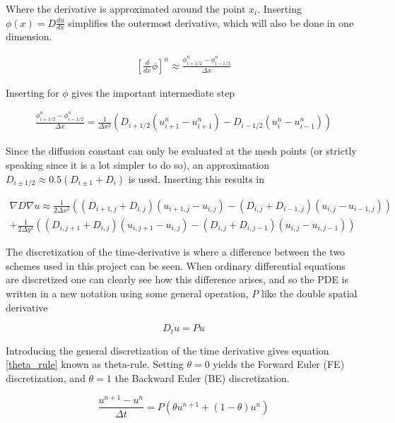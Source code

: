 Where the derivative is approximated around the point $x_i$. 
Inserting $\phi(x)=D\frac{du}{dx}$ simplifies the outermost derivative, which will also be done in one dimension.

\begin{align*}
  \left[\frac{d}{dx}\phi\right]^n \approx \frac{\phi^n_{i+1/2}-\phi^n_{i-1/2}}{\Delta x}
\end{align*}

Inserting for $\phi$ gives the important intermediate step

\begin{align*}
 \frac{\phi^n_{i+1/2}-\phi^n_{i-1/2}}{\Delta x} = \frac{1}{\Delta x^2}\left(D_{i+1/2}(u^n_{i+1}-u^n_{i+1}) -D_{i-1/2}(u^n_{i}-u^n_{i-1})\right)
\end{align*}

Since the diffusion constant can only be evaluated at the mesh points (or strictly speaking since it is a lot simpler to do so), an approximation $D_{i\pm1/2}\approx0.5(D_{i\pm1}+D_i)$ is used. 
Inserting this results in

\begin{align*}
 \nabla D\nabla u\approx\frac{1}{2\Delta x^2}\left((D_{i+1,j}+D_{i,j})(u_{i+1,j}-u_{i,j})-(D_{i,j}+D_{i-1,j})(u_{i,j}-u_{i-1,j})\right) \\
 +\frac{1}{2\Delta y^2}\left((D_{i,j+1}+D_{i,j})(u_{i,j+1}-u_{i,j})-(D_{i,j}+D_{i,j-1})(u_{i,j}-u_{i,j-1})\right)
\end{align*}

The discretization of the time-derivative is where a difference between the two schemes used in this project can be seen. 
When ordinary differential equations are discretized one can clearly see how this difference arises, and so the PDE  is written in a new notation using some general operation, $P$ like the double spatial derivative

\begin{equation}
 D_t u = Pu
\end{equation}

Introducing the general discretization of the time derivative gives equation \eqref{theta_rule} known as theta-rule. 
Setting $\theta = 0$ yields the Forward Euler (FE) discretization, and $\theta = 1$ the Backward Euler (BE) discretization. 

\begin{equation}\label{theta_rule}
 \frac{u^{n+1}-u^n}{\Delta t} = P\left(\theta u^{n+1} +(1-\theta)u^n\right)
\end{equation}

